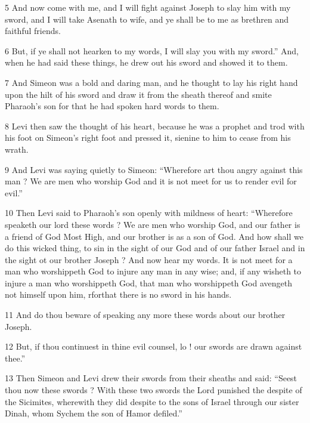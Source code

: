 \par 5 And now come with me, and I will fight against Joseph to slay him with my sword, and I will take Asenath to wife, and ye shall be to me as brethren and faithful friends. 

\par 6 But, if ye shall not hearken to my words, I will slay you with my sword.” And, when he had said these things, he drew out his sword and showed it to them. 

\par 7 And Simeon was a bold and daring man, and he thought to lay his right hand upon the hilt of his sword and draw it from the sheath thereof and smite Pharaoh's son for that he had spoken hard words to them. 

\par 8 Levi then saw the thought of his heart, because he was a prophet and trod with his foot on Simeon's right foot and pressed it, sienine to him to cease from his wrath. 

\par 9 And Levi was saying quietly to Simeon: “Wherefore art thou angry against this man ? We are men who worship God and it is not meet for us to render evil for evil.” 

\par 10 Then Levi said to Pharaoh's son openly with mildness of heart: “Wherefore speaketh our lord these words ? We are men who worship God, and our father is a friend of God Most High, and our brother is as a son of God. And how shall we do this wicked thing, to sin in the sight of our God and of our father Israel and in the sight ot our brother Joseph ? And now hear my words. It is not meet for a man who worshippeth God to injure any man in any wise; and, if any wisheth to injure a man who worshippeth God, that man who worshippeth God avengeth not himself upon him, rforthat there is no sword in his hands. 

\par 11 And do thou beware of speaking any more these words about our brother Joseph. 

\par 12 But, if thou continuest in thine evil counsel, lo ! our swords are drawn against thee.” 

\par 13 Then Simeon and Levi drew their swords from their sheaths and said: “Seest thou now these swords ? With these two swords the Lord punished the despite of the Sicimites, wherewith they did despite to the sons of Israel through our sister Dinah, whom Sychem the son of Hamor defiled.” 

